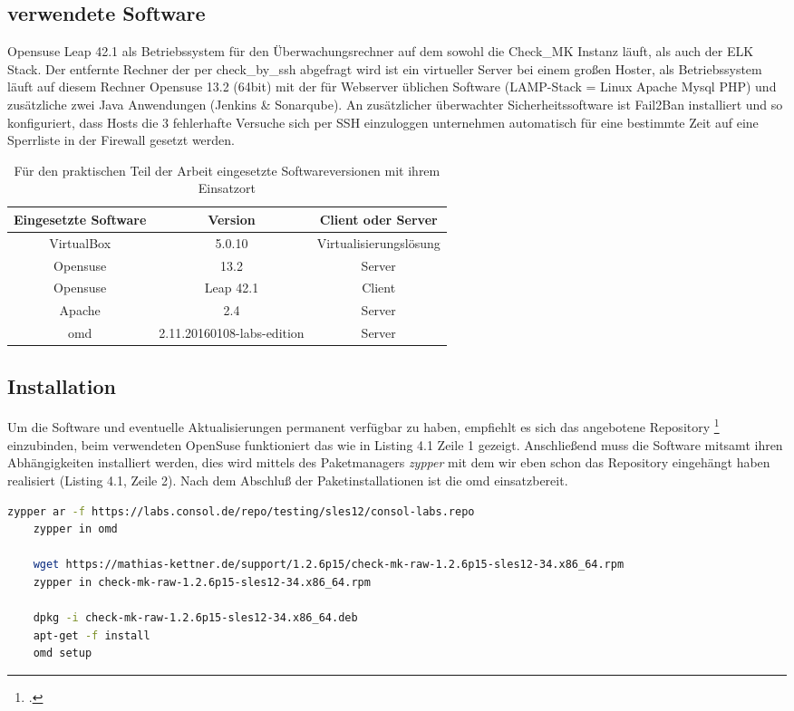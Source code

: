 \documentclass[12pt,a4paper,parskip,listof=totoc,bibliography=totoc]{scrreprt}
\begin{document}
	\subsection{verwendete Software}
	Opensuse Leap 42.1 als Betriebssystem für den Überwachungsrechner auf dem sowohl die Check\_MK Instanz läuft, als auch der ELK Stack. Der entfernte Rechner der per check\_by\_ssh abgefragt wird ist ein virtueller Server bei einem großen Hoster, als Betriebssystem läuft auf diesem Rechner Opensuse 13.2 (64bit) mit der für Webserver üblichen Software (LAMP-Stack = Linux Apache Mysql PHP) und zusätzliche zwei Java Anwendungen (Jenkins \& Sonarqube). An zusätzlicher überwachter Sicherheitssoftware ist Fail2Ban installiert und so konfiguriert, dass Hosts die 3 fehlerhafte Versuche sich per SSH einzuloggen unternehmen automatisch für eine bestimmte Zeit auf eine Sperrliste in der Firewall gesetzt werden. \\
	\begin{table}[h] %
	\begin{center}
	\begin{tabular}{|c|c|c|}
	\hline 
	Eingesetzte Software & Version & Client oder Server \\ 
	\hline 
	VirtualBox & 5.0.10 & Virtualisierungslösung\\
	\hline
	Opensuse & 13.2 & Server\\ 
	\hline 
	Opensuse & Leap 42.1 & Client\\
	\hline
	Apache & 2.4 & Server\\
	\hline
	\acrshort{omd} & 2.11.20160108-labs-edition & Server\\
	\hline
	\end{tabular} 
	\caption[Eingesetzte Softwareversionen]{Für den praktischen Teil der Arbeit eingesetzte Softwareversionen mit ihrem Einsatzort}
	\end{center}
	\end{table}
	\subsection{Installation}
	Um die Software und eventuelle Aktualisierungen permanent verfügbar zu haben, empfiehlt es sich das angebotene Repository \footcite{omdrepo} einzubinden, beim verwendeten OpenSuse funktioniert das wie in Listing 4.1 Zeile 1 gezeigt. Anschließend muss die Software mitsamt ihren Abhängigkeiten installiert werden, dies wird mittels des Paketmanagers \textit{zypper} mit dem wir eben schon das Repository eingehängt haben realisiert (Listing 4.1, Zeile 2). Nach dem Abschluß der Paketinstallationen ist die \acrshort{omd} einsatzbereit.
	\begin{lstlisting}[language=bash, caption=Konfiguration eines Repositories und Installation der \acrfull{omd}]
	zypper ar -f https://labs.consol.de/repo/testing/sles12/consol-labs.repo
	zypper in omd
	
	wget https://mathias-kettner.de/support/1.2.6p15/check-mk-raw-1.2.6p15-sles12-34.x86_64.rpm
	zypper in check-mk-raw-1.2.6p15-sles12-34.x86_64.rpm
	
	dpkg -i check-mk-raw-1.2.6p15-sles12-34.x86_64.deb
	apt-get -f install
	omd setup
	\end{lstlisting}
\end{document}
